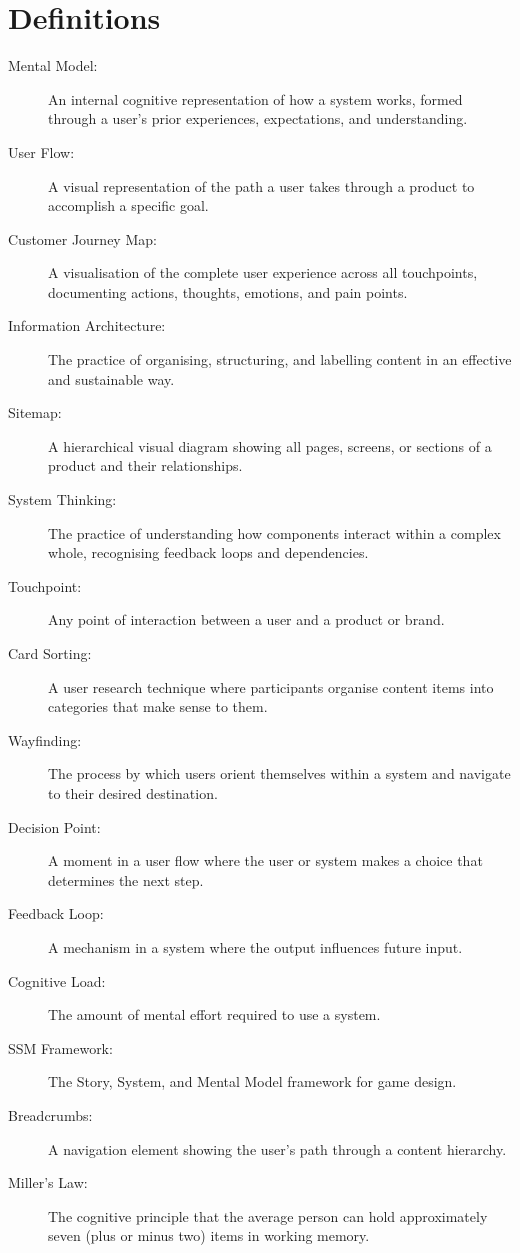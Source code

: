 \documentclass[12pt,a4paper]{article}
\begin{document}
\section*{Definitions}
\begin{description}
    \item[Mental Model:] An internal cognitive representation of how a system works, formed through a user’s prior experiences, expectations, and understanding.
    \item[User Flow:] A visual representation of the path a user takes through a product to accomplish a specific goal.
    \item[Customer Journey Map:] A visualisation of the complete user experience across all touchpoints, documenting actions, thoughts, emotions, and pain points.
    \item[Information Architecture:] The practice of organising, structuring, and labelling content in an effective and sustainable way.
    \item[Sitemap:] A hierarchical visual diagram showing all pages, screens, or sections of a product and their relationships.
    \item[System Thinking:] The practice of understanding how components interact within a complex whole, recognising feedback loops and dependencies.
    \item[Touchpoint:] Any point of interaction between a user and a product or brand.
    \item[Card Sorting:] A user research technique where participants organise content items into categories that make sense to them.
    \item[Wayfinding:] The process by which users orient themselves within a system and navigate to their desired destination.
    \item[Decision Point:] A moment in a user flow where the user or system makes a choice that determines the next step.
    \item[Feedback Loop:] A mechanism in a system where the output influences future input.
    \item[Cognitive Load:] The amount of mental effort required to use a system.
    \item[SSM Framework:] The Story, System, and Mental Model framework for game design.
    \item[Breadcrumbs:] A navigation element showing the user’s path through a content hierarchy.
    \item[Miller’s Law:] The cognitive principle that the average person can hold approximately seven (plus or minus two) items in working memory.
\end{description}
\end{document}
